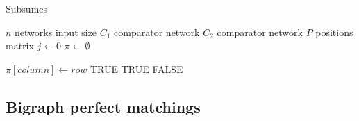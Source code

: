\documentclass[../main.tex]{subfiles}
\begin{document}
	
	\begin{algorithm}[H]
		\caption {Subsumes}
		\begin{algorithmic}
			\State $n$ networks input size
			\State $C_1$ comparator network
			\State $C_2$ comparator network
			\State $P$ positions matrix
			\State $j \leftarrow 0$
			\State $\pi \leftarrow \emptyset $ 
			
			\State $\pi[column] \leftarrow row $
			\Return TRUE
			\EndIf
			\EndIf
			\EndFor
			\Return TRUE
			\Else {}
			\Return FALSE
			\EndIf
			\EndProcedure
		\end{algorithmic}
	\end{algorithm}
	\subsection{Bigraph perfect matchings}
	
\end{document}
